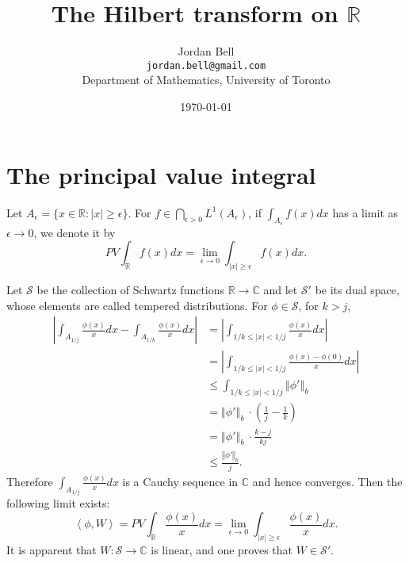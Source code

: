 \documentclass{article}
\newcommand{\inner}[2]{\left\langle #1, #2 \right\rangle}
\newcommand{\norm}[1]{\left\Vert #1 \right\Vert}
\theoremstyle{definition}
\begin{document}
\title{The Hilbert transform on $\mathbb{R}$}
\author{Jordan Bell\\ \texttt{jordan.bell@gmail.com}\\Department of Mathematics, University of Toronto}
\date{\today}

\maketitle


\section{The principal value integral}
Let $A_\epsilon=\{x \in \mathbb{R}: |x| \geq \epsilon\}$. For $f \in \bigcap_{\epsilon>0} L^1(A_\epsilon)$, 
if $\int_{A_\epsilon}  f(x) dx$ has a limit as $\epsilon \to 0$, we denote it by
\[
PV \int_{\mathbb{R}} f(x) dx = \lim_{\epsilon \to 0} \int_{|x| \geq \epsilon} f(x) dx.
\]

Let $\mathscr{S}$ be the collection of Schwartz functions $\mathbb{R} \to \mathbb{C}$ and let
$\mathscr{S}'$ be its dual space, whose elements are called tempered distributions.
For $\phi \in \mathscr{S}$, for $k>j$,
\begin{align*}
\left| \int_{A_{1/j}}  \frac{\phi(x)}{x} dx - \int_{A_{1/k}} \frac{\phi(x)}{x} dx\right|&=\left| \int_{1/k \leq |x| < 1/j} \frac{\phi(x)}{x} dx \right|\\
&=\left| \int_{1/k \leq |x| < 1/j} \frac{\phi(x)-\phi(0)}{x} dx \right|\\
&\leq \int_{1/k \leq |x| < 1/j} \norm{\phi'}_b\\
&=\norm{\phi'}_b\ \cdot \left( \frac{1}{j}-\frac{1}{k} \right)\\
&=\norm{\phi'}_b\ \cdot \frac{k-j}{kj}\\
&\leq \frac{\norm{\phi'}_b}{j}.
\end{align*}
Therefore $\int_{A_{1/j}} \frac{\phi(x)}{x} dx$ is a Cauchy sequence in $\mathbb{C}$ and hence
converges.
Then the following limit exists:
\[
\inner{\phi}{W}=PV \int_{\mathbb{R}} \frac{\phi(x)}{x} dx = \lim_{\epsilon \to 0} \int_{|x| \geq \epsilon} \frac{\phi(x)}{x} dx.
\]
It is apparent that $W:\mathscr{S} \to \mathbb{C}$ is linear, and
one proves that
$W \in \mathscr{S}'$.
\end{document}
